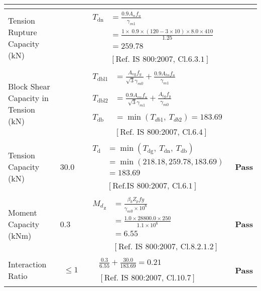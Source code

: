 \documentclass{article}%
\begin{document}
\begin{longtable}{|p{3.5cm}|p{5cm}|p{6cm}|p{1.5cm}|}
{\textbf{}
}\\%
\hline%
Tension Rupture Capacity (kN)&&$\begin{aligned} T_{\text{dn}} &= \frac{0.9 A_{n} f_u}{\gamma_{m1}}\\ &=\frac{1\times~0.9\times (120-3\times10)\times8.0\times410}{1.25}\\ &=259.78\\ \\ & [\text{Ref. IS 800:2007, Cl.6.3.1}] \end{aligned}$&\textcolor{OsdagGreen}{ 
\textbf{}
}\\%
\hline%
Block Shear Capacity in Tension (kN)&&$\begin{aligned}T_{\text{dbl1}} &= \frac{A_{\text{vg}} f_{y}}{\sqrt{3} \gamma_{m0}} + \frac{0.9 A_{tn} f_{u}}{\gamma_{m1}}\\ \\ T_{\text{dbl2}} &= \frac{0.9A_{vn} f_{u}}{\sqrt{3} \gamma_{m1}} + \frac{A_{tg} f_{y}}{\gamma_{m0}}\\ \\ T_{\text{db}} &= \min(T_{db1},~ T_{db2})= 183.69\\ \\ & [\text{Ref. IS 800:2007, Cl.6.4}] \end{aligned}$&\textcolor{OsdagGreen}{ 
\textbf{}
}\\%
\hline%
Tension Capacity (kN)&30.0&$\begin{aligned} T_{\text{d}} &= \min(T_{\text{dg}},~T_{\text{dn}},~T_{\text{db}})\\ &= \min(218.18,259.78,183.69)\\ &=183.69\\ \\ & [\text{Ref.IS 800:2007, Cl.6.1}] \end{aligned}$&\textcolor{OsdagGreen}{ 
\textbf{Pass}
}\\%
\hline%
Moment Capacity (kNm)&0.3&$\begin{aligned} {M_{d}}_{\text{z}} &= \frac{\beta_b Z_p fy}{\gamma_{m0} \times 10^6}\\ &=\frac{1.0\times28800.0\times250}{1.1 \times 10^6}\\ &=6.55\\ \\ & [\text{Ref. IS 800:2007, Cl.8.2.1.2}] \end{aligned}$&\textcolor{OsdagGreen}{ 
\textbf{Pass}
}\\%
\hline%
Interaction Ratio&$\begin{aligned} \leq1\end{aligned}$&$\begin{aligned} &\frac{0.3}{6.55}+\frac{30.0}{183.69}=0.21\\ \\ & [\text{Ref. IS 800:2007, Cl.10.7}] \end{aligned}$&\textcolor{OsdagGreen}{ 
\textbf{Pass}
}\\%
\hline%
\end{longtable}
\end{document}
